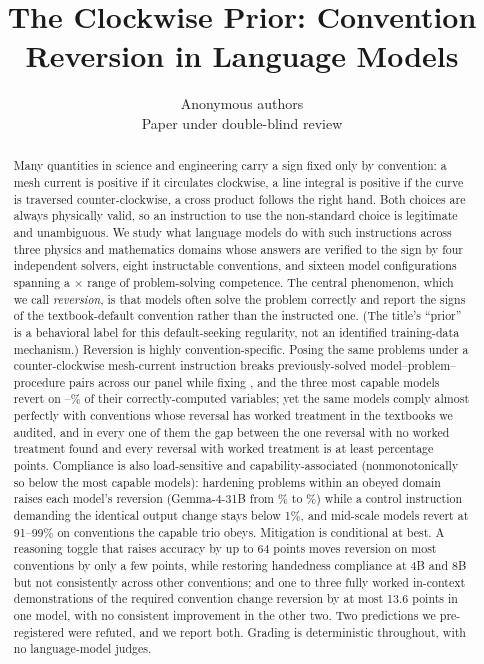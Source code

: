 \documentclass{article}
\title{The Clockwise Prior: Convention Reversion in Language Models}
\author{Anonymous authors\\Paper under double-blind review}
\begin{document}
\maketitle

\begin{abstract}
Many quantities in science and engineering carry a sign fixed only by convention: a
mesh current is positive if it circulates clockwise, a line integral is positive if
the curve is traversed counter-clockwise, a cross product follows the right hand.
Both choices are always physically valid, so an instruction to use the non-standard
choice is legitimate and unambiguous. We study what language models do with such
instructions across three physics and mathematics domains whose answers are verified
to the sign by four independent solvers, eight instructable conventions, and sixteen
model configurations spanning a \spanRatio$\times$ range of problem-solving
competence. The central phenomenon, which we call \emph{reversion}, is that models often solve
the problem correctly and report the signs of the textbook-default convention rather
than the instructed one. (The title's ``prior'' is a behavioral label for this
default-seeking regularity, not an identified training-data mechanism.) Reversion is highly
convention-specific. Posing the same problems under a counter-clockwise mesh-current
instruction breaks \bAgg{} previously-solved model--problem--procedure pairs
across our panel while fixing \cAgg{}, and the three most capable models revert on \ccwGptFive--\ccwGemma\% of
their correctly-computed variables; yet the same models comply almost perfectly with conventions whose reversal has
worked treatment in the textbooks we audited, and in every one of them the gap
between the one reversal with no worked treatment found and every reversal with
worked treatment is at least \tierSepMinPrec{} percentage points. Compliance is
also load-sensitive and capability-associated (nonmonotonically so below the most
capable models): hardening problems within an obeyed domain
raises each model's reversion (Gemma-4-31B from \vCwEGemma\% to \vCwHGemma\%) while
a control instruction demanding the identical output change stays below 1\%, and
mid-scale models revert at 91--99\% on conventions the capable trio obeys.
Mitigation is conditional at best. A reasoning toggle that raises accuracy by up to
64 points moves reversion on most conventions by only a few points, while
restoring handedness compliance at 4B and 8B but not consistently across other
conventions; and one
to three fully worked in-context demonstrations of the required convention change
reversion by at most 13.6 points in one model, with no consistent improvement in
the other two. Two
predictions we pre-registered were refuted, and we report both. Grading is
deterministic throughout, with no language-model judges.
\end{abstract}
\end{document}
